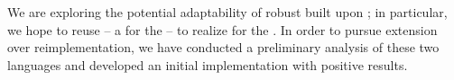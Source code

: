 We are exploring the potential adaptability of robust \vms{} built upon \vmframeworks{}; in particular, we hope to reuse \textsc{\SOMns{}} -- a \tvm{} for the \NewspeakPL{} -- to realize \tvm{} for the \GracePL{}. In order to pursue extension over reimplementation, we have conducted a preliminary analysis of these two languages and developed an initial implementation with positive results.

